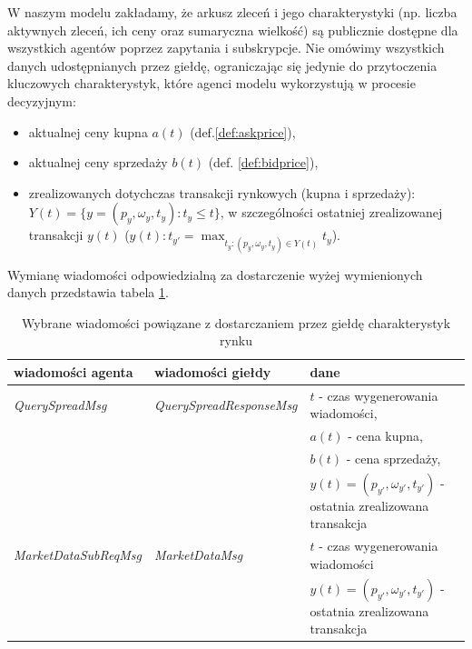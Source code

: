 W naszym modelu zakładamy, że arkusz zleceń i jego charakterystyki (np. liczba aktywnych zleceń, ich ceny oraz sumaryczna wielkość) są publicznie dostępne dla wszystkich agentów poprzez zapytania i subskrypcje. Nie omówimy wszystkich danych udostępnianych przez giełdę, ograniczając się jedynie do przytoczenia kluczowych charakterystyk, które agenci modelu wykorzystują w procesie decyzyjnym:

\begin{itemize}
\item aktualnej ceny kupna $a(t)$ (def.\ref{def:askprice}),
\item aktualnej ceny sprzedaży $b(t)$ (def. \ref{def:bidprice}),
\item zrealizowanych dotychczas transakcji rynkowych (kupna i sprzedaży): $Y(t) = \{y = (p_y, \omega_y, t_y) : t_y \leq t\}$, w szczególności ostatniej zrealizowanej transakcji $y(t)$ ($y(t): t_{y'} = \max_{t_y: (p_y, \omega_y, t_y) \in Y(t)} t_y$).
\end{itemize}
Wymianę wiadomości odpowiedzialną za dostarczenie wyżej wymienionych danych przedstawia tabela \ref{tab:marketdata}.

\begin{table}
\caption{Wybrane wiadomości powiązane z dostarczaniem przez giełdę charakterystyk rynku} 
\label{tab:marketdata}
\begin{center}
\begin{tabular}{ |p{3.5cm}|p{4.5cm}|p{5cm}|}
\hline
\textbf{wiadomości agenta} & \textbf{wiadomości giełdy} &\textbf{dane} \\
\hline
\textit{QuerySpreadMsg} & \textit{QuerySpreadResponseMsg} & $t$ - czas wygenerowania wiadomości,\\
& & $a(t)$ - cena kupna,\\ 
& & $b(t)$ - cena sprzedaży,\\
& & $y(t) = (p_{y'}, \omega_{y'}, t_{y'})$ - ostatnia zrealizowana transakcja\\
\hline
\textit{MarketDataSubReqMsg}&\textit{MarketDataMsg} &$t$ - czas wygenerowania wiadomości  \\
& & $y(t) = (p_{y'}, \omega_{y'}, t_{y'})$ - ostatnia zrealizowana transakcja\\
\hline

\end{tabular}
\end{center}

\end{table}

